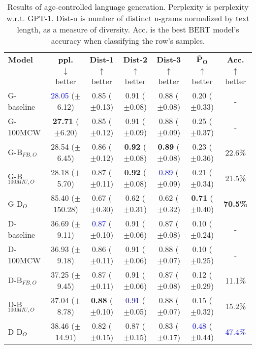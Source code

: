 \begin{table*}[h]
    \centering
    \begin{tabular}{l | c c c c | c c}
    \toprule
    \textbf{Model} & \textbf{ppl.} & \textbf{Dist-1} & \textbf{Dist-2} & \textbf{Dist-3} & $\boldsymbol{\bar{P}_O}$ & \textbf{Acc.}\\
     & $\downarrow$ better & $\uparrow$ better & $\uparrow$ better & $\uparrow$ better & $\uparrow$ better & $\uparrow$ better\\
    \midrule
    \midrule
    G-baseline & \textcolor{blue}{28.05} ($\pm$6.12) & 0.85 ($\pm$0.13) & 0.91 ($\pm$0.08) & 0.88 ($\pm$0.08) & 0.20 ($\pm$0.33) & -\\
    G-100MCW & \textbf{27.71} ($\pm$6.20) & 0.85 ($\pm$0.12) & 0.91 ($\pm$0.09) & 0.88 ($\pm$0.09) & 0.25 ($\pm$0.37) & -\\
    \midrule
    G-B$_{FB, O}$ & 28.54 ($\pm$6.45) & 0.86 ($\pm$0.12) & \textbf{0.92} ($\pm$0.08) & \textbf{0.89} ($\pm$0.08) & 0.23 ($\pm$0.36) & 22.6\%\\
    G-B$_{100MIU, O}$ & 28.18 ($\pm$5.70) & 0.87 ($\pm$0.11) & \textbf{0.92} ($\pm$0.08) & \textcolor{blue}{0.89} ($\pm$0.09) & 0.21 ($\pm$0.34) & 21.5\%\\
    \midrule
    G-D$_{O}$ & 85.40 ($\pm$150.28) & 0.67 ($\pm$0.30) & 0.62 ($\pm$0.31) & 0.62 ($\pm$0.32) & \textbf{0.71} ($\pm$0.40) & \textbf{70.5\%}\\
    \midrule
    \midrule
    D-baseline & 36.69 ($\pm$9.11) & \textcolor{blue}{0.87} ($\pm$0.10) & 0.91 ($\pm$0.06) & 0.87 ($\pm$0.08) & 0.10 ($\pm$0.24) & -\\
    D-100MCW & 36.93 ($\pm$9.18) & 0.86 ($\pm$0.11) & 0.91 ($\pm$0.06) & 0.88 ($\pm$0.07) & 0.10 ($\pm$0.25) & -\\
    \midrule
    D-B$_{FB, O}$ & 37.25 ($\pm$9.45) & 0.87 ($\pm$0.11) & 0.91 ($\pm$0.06) & 0.87 ($\pm$0.08) & 0.12 ($\pm$0.29) & 11.1\%\\
    D-B$_{100MIU, O}$ & 37.04 ($\pm$8.78) & \textbf{0.88} ($\pm$0.10) & \textcolor{blue}{0.91} ($\pm$0.05) & 0.88 ($\pm$0.07) & 0.15 ($\pm$0.32) & 15.2\%\\
    \midrule
    D-D$_{O}$ & 38.46 ($\pm$14.91) & 0.82 ($\pm$0.15) & 0.87 ($\pm$0.15) & 0.83 ($\pm$0.17) & \textcolor{blue}{0.48} ($\pm$0.44) & \textcolor{blue}{47.4\%}\\
    \bottomrule
    \end{tabular}
    \caption{ Results of age-controlled language generation. Perplexity is perplexity w.r.t. GPT-1. Dist-n is number of distinct n-grams normalized by text length, as a measure of diversity. Acc. is the best BERT model's accuracy when classifying the row's samples.}
    \label{tab:ctg_results_ws_young_prompt_old_model}
\end{table*}


